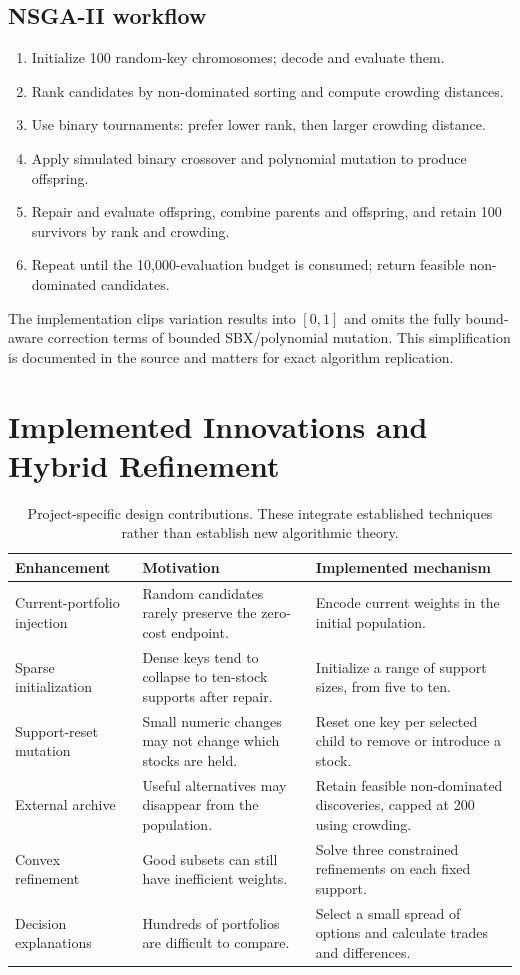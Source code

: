 \documentclass[12pt,a4paper]{article}
\newcommand{\newsec}[1]{\section{#1}}
\begin{document}
\subsection{NSGA-II workflow}
\begin{enumerate}
\item Initialize 100 random-key chromosomes; decode and evaluate them.
\item Rank candidates by non-dominated sorting and compute crowding distances.
\item Use binary tournaments: prefer lower rank, then larger crowding distance.
\item Apply simulated binary crossover and polynomial mutation to produce offspring.
\item Repair and evaluate offspring, combine parents and offspring, and retain 100 survivors by rank and crowding.
\item Repeat until the 10,000-evaluation budget is consumed; return feasible non-dominated candidates.
\end{enumerate}
The implementation clips variation results into $[0,1]$ and omits the fully bound-aware correction terms of bounded SBX/polynomial mutation. This simplification is documented in the source and matters for exact algorithm replication.

\newsec{Implemented Innovations and Hybrid Refinement}
\begin{table}[H]\centering\small
\begin{tabularx}{\linewidth}{@{}p{35mm}YY@{}}\toprule
Enhancement & Motivation & Implemented mechanism\\\midrule
Current-portfolio injection & Random candidates rarely preserve the zero-cost endpoint. & Encode current weights in the initial population.\\
Sparse initialization & Dense keys tend to collapse to ten-stock supports after repair. & Initialize a range of support sizes, from five to ten.\\
Support-reset mutation & Small numeric changes may not change which stocks are held. & Reset one key per selected child to remove or introduce a stock.\\
External archive & Useful alternatives may disappear from the population. & Retain feasible non-dominated discoveries, capped at 200 using crowding.\\
Convex refinement & Good subsets can still have inefficient weights. & Solve three constrained refinements on each fixed support.\\
Decision explanations & Hundreds of portfolios are difficult to compare. & Select a small spread of options and calculate trades and differences.\\\bottomrule
\end{tabularx}
\caption{Project-specific design contributions. These integrate established techniques rather than establish new algorithmic theory.}
\end{table}
\end{document}
